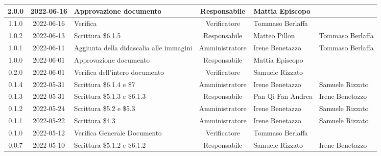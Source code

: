 \begin{center}
\begin{longtable}{ |c|c|p{8em}|c|m{5em}|m{5em}| }
	\hline
	2.0.0 & 2022-06-16 & Approvazione documento & Responsabile & Mattia \newline Episcopo & \\
	\hline 
	1.1.0 & 2022-06-16 & Verifica & Verificatore & Tommaso \newline Berlaffa & \\
	\hline 
  1.0.2 & 2022-06-13 & Scrittura \$6.1.5 & Responsabile & Matteo \newline Pillon & Tommaso \newline Berlaffa\\
	\hline 
	1.0.1 & 2022-06-11 & Aggiunta della didascalia alle immagini & Amministratore & Irene \newline Benetazzo & Tommaso \newline Berlaffa\\
	\hline 
	1.0.0 & 2022-06-01 & Approvazione documento & Responsabile & Mattia \newline Episcopo & \\
	\hline 
	0.2.0 & 2022-06-01 & Verifica dell'intero documento & Verificatore & Samuele \newline Rizzato & \\
	\hline 
	0.1.4 & 2022-05-31 & Scrittura \$6.1.4 e \$7 & Amministratore & Irene \newline Benetazzo & Samuele \newline Rizzato\\
	\hline 
	0.1.3 & 2022-05-31 & Scrittura \$5.1.3 e \$6.1.3 & Responsabile & Pan Qi Fan \newline Andrea & Irene \newline Benetazzo \\
	\hline
	0.1.2 & 2022-05-24 & Scrittura \$5.2 e \$5.3 & Amministratore & Irene \newline Benetazzo & Samuele \newline Rizzato \\
	\hline
	0.1.1 & 2022-05-22 & Scrittura \$4.3 & Amministratore & Irene \newline Benetazzo & Samuele \newline Rizzato \\
	\hline 
	0.1.0 & 2022-05-12 & Verifica Generale Documento & Verificatore & Tommaso \newline Berlaffa  & \\
    \hline
	0.0.7 & 2022-05-10 & Scrittura \$5.1.2 e \$6.1.2 & Responsabile & Samuele \newline Rizzato & Irene \newline Benetazzo \\

\end{longtable}
\end{center}
